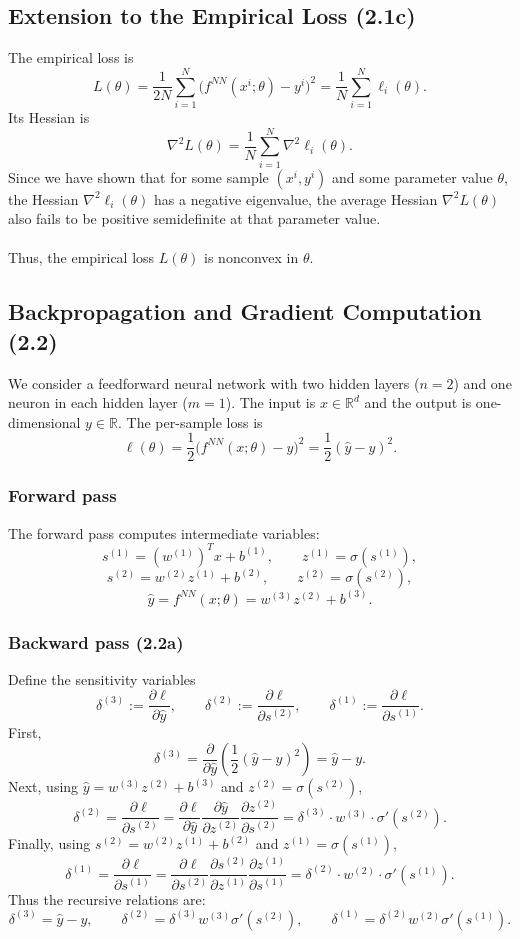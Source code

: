 \documentclass[11pt]{article}
\newcommand{\R}{\mathbb{R}}
\begin{document}
\subsection*{Extension to the Empirical Loss (2.1c)}

The empirical loss is
\[
L(\theta)
=
\frac{1}{2N}
\sum_{i=1}^{N}
\bigl(f^{NN}(x^i;\theta)-y^i\bigr)^2
=
\frac{1}{N}
\sum_{i=1}^{N}
\ell_i(\theta).
\]
Its Hessian is
\[
\nabla^2 L(\theta)
=
\frac{1}{N}
\sum_{i=1}^{N}
\nabla^2 \ell_i(\theta).
\]
Since we have shown that for some sample $(x^i,y^i)$ and some parameter value $\theta$, the Hessian $\nabla^2 \ell_i(\theta)$ has a negative eigenvalue, the average Hessian $\nabla^2 L(\theta)$ also fails to be positive semidefinite at that parameter value.
\\
\\
Thus, the empirical loss $L(\theta)$ is nonconvex in $\theta$.
\subsection*{Backpropagation and Gradient Computation (2.2)}

We consider a feedforward neural network with two hidden layers ($n=2$) and one neuron in each hidden layer ($m=1$). The input is $x \in \R^d$ and the output is one-dimensional $y\in\R$. The per-sample loss is
\[
\ell(\theta) = \frac{1}{2}\bigl(f^{NN}(x;\theta)-y\bigr)^2 = \frac{1}{2}(\hat{y}-y)^2.
\]

\subsubsection*{Forward pass}
The forward pass computes intermediate variables:
\[
s^{(1)} = (w^{(1)})^T x + b^{(1)}, \qquad z^{(1)} = \sigma(s^{(1)}),
\]
\[
s^{(2)} = w^{(2)} z^{(1)} + b^{(2)}, \qquad z^{(2)} = \sigma(s^{(2)}),
\]
\[
\hat{y} = f^{NN}(x;\theta) = w^{(3)} z^{(2)} + b^{(3)}.
\]

\subsubsection*{Backward pass (2.2a)}
Define the sensitivity variables
\[
\delta^{(3)} := \frac{\partial \ell}{\partial \hat{y}}, 
\qquad
\delta^{(2)} := \frac{\partial \ell}{\partial s^{(2)}}, 
\qquad
\delta^{(1)} := \frac{\partial \ell}{\partial s^{(1)}}.
\]
First,
\[
\delta^{(3)} = \frac{\partial}{\partial \hat{y}}\left(\frac{1}{2}(\hat{y}-y)^2\right)=\hat{y}-y.
\]
Next, using $\hat{y}=w^{(3)}z^{(2)}+b^{(3)}$ and $z^{(2)}=\sigma(s^{(2)})$,
\[
\delta^{(2)}
=
\frac{\partial \ell}{\partial s^{(2)}}
=
\frac{\partial \ell}{\partial \hat{y}}
\frac{\partial \hat{y}}{\partial z^{(2)}}
\frac{\partial z^{(2)}}{\partial s^{(2)}}
=
\delta^{(3)}\cdot w^{(3)}\cdot \sigma'(s^{(2)}).
\]
Finally, using $s^{(2)}=w^{(2)}z^{(1)}+b^{(2)}$ and $z^{(1)}=\sigma(s^{(1)})$,
\[
\delta^{(1)}
=
\frac{\partial \ell}{\partial s^{(1)}}
=
\frac{\partial \ell}{\partial s^{(2)}}
\frac{\partial s^{(2)}}{\partial z^{(1)}}
\frac{\partial z^{(1)}}{\partial s^{(1)}}
=
\delta^{(2)}\cdot w^{(2)}\cdot \sigma'(s^{(1)}).
\]
Thus the recursive relations are:
\[
\boxed{
\delta^{(3)}=\hat{y}-y,\qquad
\delta^{(2)}=\delta^{(3)}w^{(3)}\sigma'(s^{(2)}),\qquad
\delta^{(1)}=\delta^{(2)}w^{(2)}\sigma'(s^{(1)}).
}
\]
\newpage 
\end{document}
